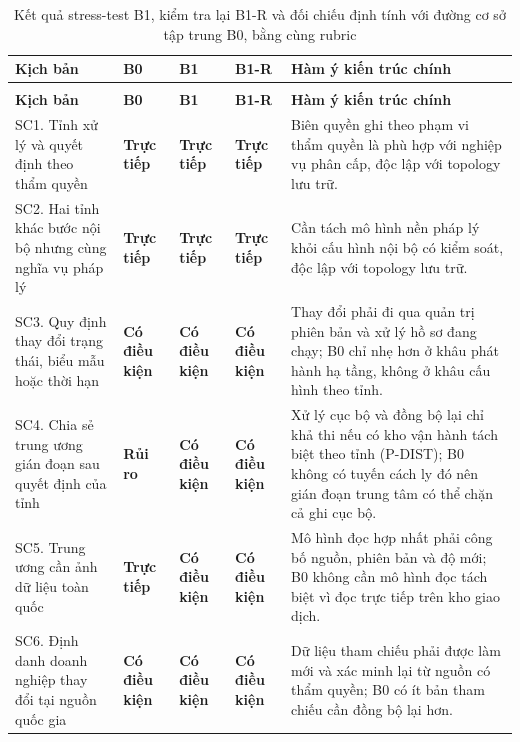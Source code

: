 {\vjsttablefont
\setlength{\tabcolsep}{2.4pt}
\renewcommand{\arraystretch}{1.02}
\begin{longtable}{@{}>{\raggedright\arraybackslash}p{3.5cm}>{\raggedright\arraybackslash}p{1.75cm}>{\raggedright\arraybackslash}p{1.75cm}>{\raggedright\arraybackslash}p{1.75cm}>{\raggedright\arraybackslash}p{5.25cm}@{}}
\caption{Kết quả stress-test B1, kiểm tra lại B1-R và đối chiếu định tính với đường cơ sở tập trung B0, bằng cùng rubric}
\label{tab:evaluation}\\
\toprule
\textbf{Kịch bản} & \textbf{B0} & \textbf{B1} & \textbf{B1-R} & \textbf{Hàm ý kiến trúc chính} \\
\midrule
\endfirsthead
\multicolumn{5}{c}{\tablename\ \thetable\ -- tiếp theo}\\
\toprule
\textbf{Kịch bản} & \textbf{B0} & \textbf{B1} & \textbf{B1-R} & \textbf{Hàm ý kiến trúc chính} \\
\midrule
\endhead
\bottomrule
\endfoot
SC1. Tỉnh xử lý và quyết định theo thẩm quyền & \textbf{Trực tiếp} & \textbf{Trực tiếp} & \textbf{Trực tiếp} & Biên quyền ghi theo phạm vi thẩm quyền là phù hợp với nghiệp vụ phân cấp, độc lập với topology lưu trữ. \\
SC2. Hai tỉnh khác bước nội bộ nhưng cùng nghĩa vụ pháp lý & \textbf{Trực tiếp} & \textbf{Trực tiếp} & \textbf{Trực tiếp} & Cần tách mô hình nền pháp lý khỏi cấu hình nội bộ có kiểm soát, độc lập với topology lưu trữ. \\
SC3. Quy định thay đổi trạng thái, biểu mẫu hoặc thời hạn & \textbf{Có điều kiện} & \textbf{Có điều kiện} & \textbf{Có điều kiện} & Thay đổi phải đi qua quản trị phiên bản và xử lý hồ sơ đang chạy; B0 chỉ nhẹ hơn ở khâu phát hành hạ tầng, không ở khâu cấu hình theo tỉnh. \\
SC4. Chia sẻ trung ương gián đoạn sau quyết định của tỉnh & \textbf{Rủi ro} & \textbf{Có điều kiện} & \textbf{Có điều kiện} & Xử lý cục bộ và đồng bộ lại chỉ khả thi nếu có kho vận hành tách biệt theo tỉnh (P-DIST); B0 không có tuyến cách ly đó nên gián đoạn trung tâm có thể chặn cả ghi cục bộ. \\
SC5. Trung ương cần ảnh dữ liệu toàn quốc & \textbf{Trực tiếp} & \textbf{Có điều kiện} & \textbf{Có điều kiện} & Mô hình đọc hợp nhất phải công bố nguồn, phiên bản và độ mới; B0 không cần mô hình đọc tách biệt vì đọc trực tiếp trên kho giao dịch. \\
SC6. Định danh doanh nghiệp thay đổi tại nguồn quốc gia & \textbf{Có điều kiện} & \textbf{Có điều kiện} & \textbf{Có điều kiện} & Dữ liệu tham chiếu phải được làm mới và xác minh lại từ nguồn có thẩm quyền; B0 có ít bản tham chiếu cần đồng bộ lại hơn. \\

\end{longtable}}
